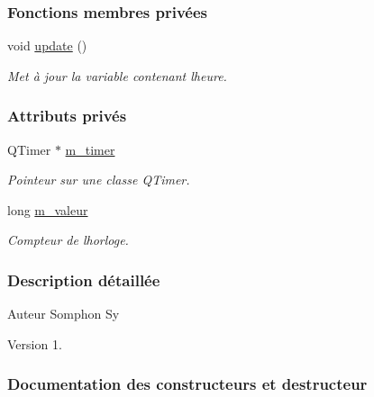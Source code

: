 \subsubsection*{Fonctions membres privées}
\begin{DoxyCompactItemize}
\item 
void \hyperlink{class_chronometre_utilisation_add760c3052342baec482fe0752a89b86}{update} ()
\begin{DoxyCompactList}\small\item\em Met à jour la variable contenant l\textquotesingle{}heure. \end{DoxyCompactList}\end{DoxyCompactItemize}
\subsubsection*{Attributs privés}
\begin{DoxyCompactItemize}
\item 
Q\+Timer $\ast$ \hyperlink{class_chronometre_utilisation_ae86620ca7d91c0d06c2e695493638bf2}{m\+\_\+timer}
\begin{DoxyCompactList}\small\item\em Pointeur sur une classe Q\+Timer. \end{DoxyCompactList}\item 
long \hyperlink{class_chronometre_utilisation_a7ef8b30ae4b6db56b9be832c847186ea}{m\+\_\+valeur}
\begin{DoxyCompactList}\small\item\em Compteur de l\textquotesingle{}horloge. \end{DoxyCompactList}\end{DoxyCompactItemize}


\subsubsection{Description détaillée}
\begin{DoxyAuthor}{Auteur}
Somphon Sy
\end{DoxyAuthor}
\begin{DoxyVersion}{Version}
1. 
\end{DoxyVersion}


\subsubsection{Documentation des constructeurs et destructeur}
\mbox{\label{class_chronometre_utilisation_a499bd70e5056ddb71df022848d1e345e}} 
